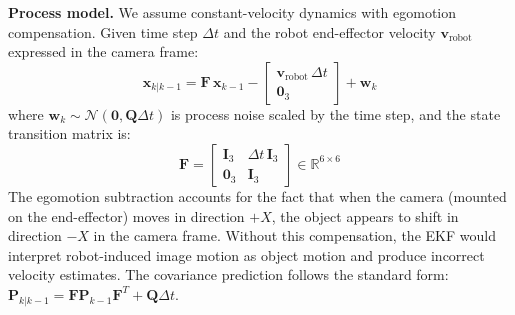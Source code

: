 \documentclass[letterpaper, 10 pt, conference]{ieeeconf}  %
\begin{document}
\textbf{Process model.}
We assume constant-velocity dynamics with egomotion compensation. Given time step $\Delta t$ and the robot end-effector velocity $\mathbf{v}_{\text{robot}}$ expressed in the camera frame:
\begin{equation}
\mathbf{x}_{k|k-1} = \mathbf{F} \, \mathbf{x}_{k-1} - \begin{bmatrix} \mathbf{v}_{\text{robot}} \, \Delta t \\ \mathbf{0}_3 \end{bmatrix} + \mathbf{w}_k
\label{eq:process}
\end{equation}
where $\mathbf{w}_k \sim \mathcal{N}(\mathbf{0}, \mathbf{Q} \Delta t)$ is process noise scaled by the time step, and the state transition matrix is:
\begin{equation}
\mathbf{F} = \begin{bmatrix} \mathbf{I}_3 & \Delta t \, \mathbf{I}_3 \\ \mathbf{0}_3 & \mathbf{I}_3 \end{bmatrix} \in \mathbb{R}^{6 \times 6}
\end{equation}
The egomotion subtraction accounts for the fact that when the camera (mounted on the end-effector) moves in direction $+X$, the object appears to shift in direction $-X$ in the camera frame. Without this compensation, the EKF would interpret robot-induced image motion as object motion and produce incorrect velocity estimates. The covariance prediction follows the standard form: $\mathbf{P}_{k|k-1} = \mathbf{F} \mathbf{P}_{k-1} \mathbf{F}^T + \mathbf{Q} \Delta t$.
\end{document}
